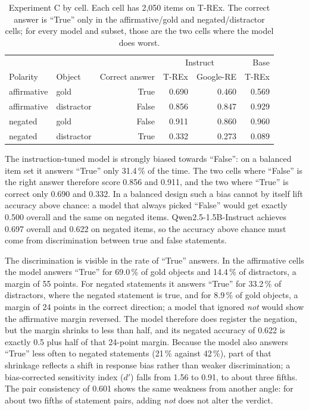 \documentclass{article}
\begin{document}
\begin{table}[t]
\centering\small
\caption{Experiment C by cell. Each cell has 2{,}050 items on T-REx. The correct
answer is ``True'' only in the affirmative/gold and negated/distractor cells; for every model and subset, those are the two cells
where the model does worst.}
\label{tab:cells}
\begin{tabular}{llrrrr}
\toprule
 & & & \multicolumn{2}{c}{Instruct} & Base \\
Polarity & Object & Correct answer & T-REx & Google-RE & T-REx \\
\midrule
affirmative & gold       & True  & 0.690 & 0.460 & 0.569 \\
affirmative & distractor & False & 0.856 & 0.847 & 0.929 \\
negated     & gold       & False & 0.911 & 0.860 & 0.960 \\
negated     & distractor & True  & 0.332 & 0.273 & 0.089 \\
\bottomrule
\end{tabular}
\end{table}

The instruction-tuned model is strongly biased towards ``False'': on a balanced item set it answers ``True'' only 31.4\,\% of the time. The two cells where ``False'' is the right answer therefore score 0.856 and 0.911, and the two where ``True'' is correct only 0.690 and 0.332. In a balanced design such a bias cannot by itself lift accuracy above chance: a model that always picked ``False'' would get exactly 0.500 overall and the same on negated items. Qwen2.5-1.5B-Instruct achieves 0.697 overall and 0.622 on negated items, so the accuracy above chance must come from discrimination between true and false statements.

The discrimination is visible in the rate of ``True'' answers. In the affirmative cells the model answers ``True'' for 69.0\,\% of gold objects and 14.4\,\% of distractors, a margin of 55 points. For negated statements it answers ``True'' for 33.2\,\% of distractors, where the negated statement is true, and for 8.9\,\% of gold objects, a margin of 24 points in the correct direction; a model that ignored \emph{not} would show the affirmative margin reversed. The model therefore does register the negation, but the margin shrinks to less than half, and its negated accuracy of 0.622 is exactly 0.5 plus half of that 24-point margin. Because the model also answers ``True'' less often to negated statements (21\,\% against 42\,\%), part of that shrinkage reflects a shift in response bias rather than weaker discrimination; a bias-corrected sensitivity index ($d'$) falls from 1.56 to 0.91, to about three fifths. The pair consistency of 0.601 shows the same weakness from another angle: for about two fifths of statement pairs, adding \emph{not} does not alter the verdict.
\end{document}
